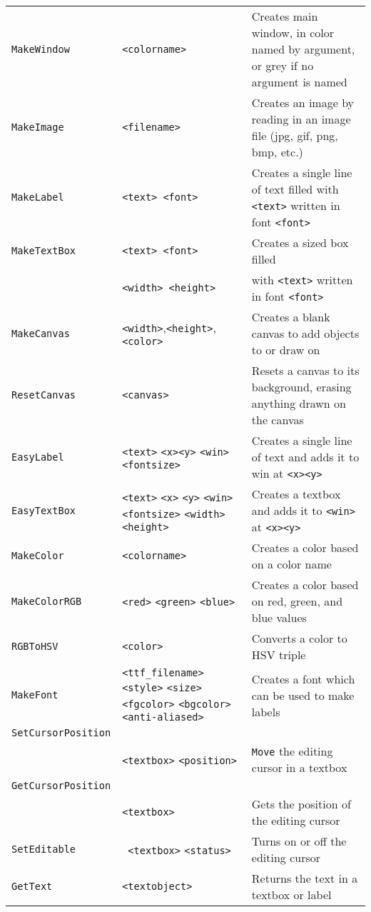 \begin{longtable}{p{3cm}p{3cm}p{6cm}}
\verb+MakeWindow+ &\verb+<colorname>+ &Creates main window, in color named by argument, or grey if no argument is named\\ 
\verb+MakeImage+ &\verb+<filename>+ &Creates an image by reading in an image file (jpg, gif, png, bmp, etc.)\\ 
\verb+MakeLabel+ &\verb+<text> <font>+&Creates a single line of text filled with \verb+<text>+ written in font \verb+<font>+\\ 
\verb+MakeTextBox+ &\verb+<text> <font>+ &Creates a sized box filled \\ 
&\verb+<width> <height>+& with \verb+<text>+ written in font \verb+<font>+ \\ 
\verb+MakeCanvas+&\verb+<width>+,\verb+<height>+,\verb+<color>+&Creates a blank canvas
to add objects to or draw on\\
\verb+ResetCanvas+&\verb+<canvas>+&Resets a canvas to its background,
erasing anything drawn on the canvas\\
\verb+EasyLabel+ &\verb+<text>+ \verb+<x>+\verb+<y>+ \verb+<win>+\verb+<fontsize>+&Creates a single line of text and adds it to win at \verb+<x>+\verb+<y>+\\ 
\verb+EasyTextBox+ &\verb+<text>+ \verb+<x>+ \verb+<y>+ \verb+<win>+ \verb+<fontsize>+ \verb+<width>+ \verb+<height>+&Creates a textbox and adds it to \verb+<win>+ at \verb+<x>+\verb+<y>+\\ 
\verb+MakeColor+ &\verb+<colorname>+ & Creates a color based on a color name\\ 
\verb+MakeColorRGB+ &\verb+<red>+ \verb+<green>+ \verb+<blue>+ & Creates a color based on red, green, and blue values\\ 
\verb+RGBToHSV+ &\verb+<color>+ & Converts a color to HSV triple\\ 
\verb+MakeFont+ &\verb+<ttf_filename>+ \verb+<style>+ \verb+<size>+ \verb+<fgcolor>+ \verb+<bgcolor>+ \verb+<anti-aliased>+&Creates a font which can be used to make labels \\ 
\verb+SetCursorPosition+\\
   &\verb+<textbox>+ \verb+<position>+ & \verb+Move+ the editing cursor in a textbox\\ 
\verb+GetCursorPosition+\\
   &\verb+<textbox>+ &Gets the position of the editing cursor\\ 
\verb+SetEditable+ &\verb+ <textbox>+ \verb+<status>+& Turns on or off the editing cursor\\ 
\verb+GetText+ &\verb+<textobject>+ &Returns the text in a textbox or label\\ 

\end{longtable}
